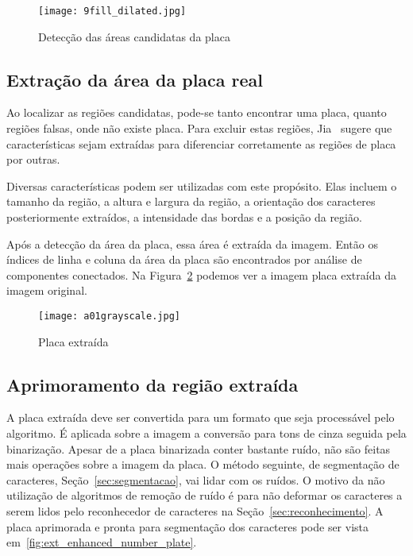 \begin{figure}[H]
	\centering
	\texttt{[image: 9fill\_dilated.jpg]}
	\caption{Detecção das áreas candidatas da placa}
	\label{fig:ext_plate_area_detection}
\end{figure}

\subsection{Extração da área da placa real}

Ao localizar as regiões candidatas, pode-se tanto encontrar uma placa, quanto
regiões falsas, onde não existe placa. Para excluir estas regiões,
Jia~\cite{jia2007region} sugere que características sejam extraídas para
diferenciar corretamente as regiões de placa por outras.

Diversas características podem ser utilizadas com este propósito. Elas incluem o
tamanho da região, a altura e largura da região, a orientação dos caracteres
posteriormente extraídos, a intensidade das bordas e a posição da região.

Após a detecção da área da placa, essa área é extraída da imagem. Então os
índices de linha e coluna da área da placa são encontrados por análise de
componentes conectados. Na Figura~\ref{fig:ext_true_number_plate} podemos ver a
imagem placa extraída da imagem original.

\begin{figure}[H]
	\centering
	\texttt{[image: a01grayscale.jpg]}
	\caption{Placa extraída}
	\label{fig:ext_true_number_plate}
\end{figure}

\subsection{Aprimoramento da região extraída}

A placa extraída deve ser convertida para um formato que seja processável pelo
algoritmo. É aplicada sobre a imagem a conversão para tons de cinza seguida pela
binarização. Apesar de a placa binarizada conter bastante ruído, não são feitas
mais operações sobre a imagem da placa. O método seguinte, de segmentação de
caracteres, Seção~\ref{sec:segmentacao}, vai lidar com os ruídos. O motivo da
não utilização de algoritmos de remoção de ruído é para não deformar os
caracteres a serem lidos pelo reconhecedor de caracteres na
Seção~\ref{sec:reconhecimento}. A placa aprimorada e pronta para segmentação dos
caracteres pode ser vista em~\ref{fig:ext_enhanced_number_plate}.

